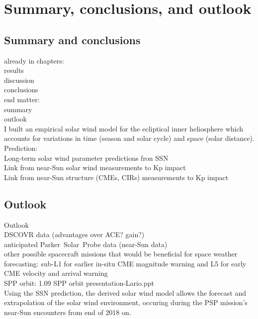 
\chapter{Summary, conclusions, and outlook}
\label{chap:summary}


\section{Summary and conclusions}

already in chapters:\\
results\\
discussion\\
conclusions\\

end matter:\\
summary\\
outlook\\



I built an empirical solar wind model for the ecliptical inner heliosphere which accounts for variations in time (season and solar cycle) and space (solar distance).\\

Prediction:\\
Long-term solar wind parameter predictions fron SSN\\
Link from near-Sun solar wind measurements to Kp impact\\
Link from near-Sun structure (CMEs, CIRs) measurements to Kp impact\\


\section{Outlook}


Outlook\\
DSCOVR data (advantages over ACE? gain?)\\
anticipated Parker~Solar~Probe data (near-Sun data)\\

other possible spacecraft missions that would be beneficial for space weather forecasting: sub-L1 for earlier in-situ CME magnitude warning and L5 for early CME velocity and arrival warning \citep{Vourlidas2015}\\

SPP orbit:	1.09 SPP orbit presentation-Lario.ppt\\

Using the SSN prediction, the derived solar wind model allows the forecast and extrapolation of the solar wind environment, occuring during the PSP mission's near-Sun encounters from end of 2018 on.\\



